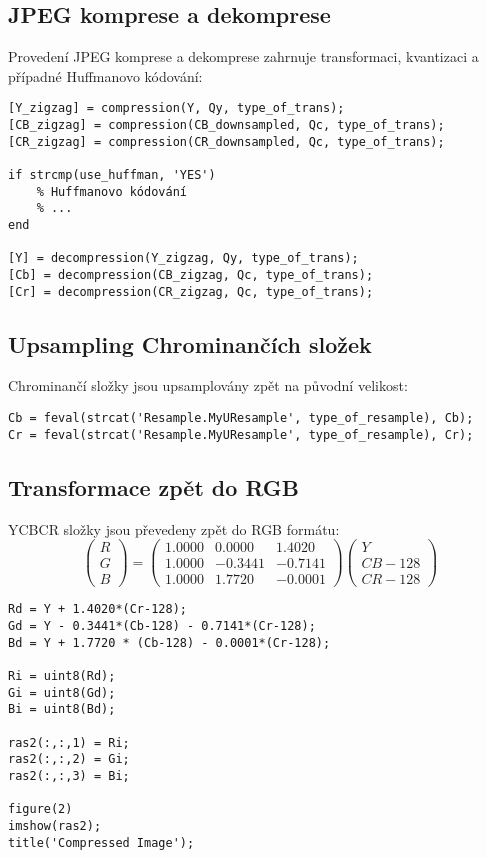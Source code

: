 \subsection*{JPEG komprese a dekomprese}
Provedení JPEG komprese a dekomprese zahrnuje transformaci, kvantizaci a případné Huffmanovo kódování:
\begin{verbatim}
[Y_zigzag] = compression(Y, Qy, type_of_trans);
[CB_zigzag] = compression(CB_downsampled, Qc, type_of_trans);
[CR_zigzag] = compression(CR_downsampled, Qc, type_of_trans);

if strcmp(use_huffman, 'YES')
    % Huffmanovo kódování
    % ...
end

[Y] = decompression(Y_zigzag, Qy, type_of_trans);
[Cb] = decompression(CB_zigzag, Qc, type_of_trans);
[Cr] = decompression(CR_zigzag, Qc, type_of_trans);
\end{verbatim}

\subsection*{Upsampling Chrominančích složek}
Chrominančí složky jsou upsamplovány zpět na původní velikost:
\begin{verbatim}
Cb = feval(strcat('Resample.MyUResample', type_of_resample), Cb);
Cr = feval(strcat('Resample.MyUResample', type_of_resample), Cr);
\end{verbatim}

\subsection*{Transformace zpět do RGB}
YCBCR složky jsou převedeny zpět do RGB formátu\cite{pIDhmNtdwMgbcGoe}\cite{ygeiGeoinf2}:
\[
\begin{pmatrix}
R \\
G \\
B
\end{pmatrix}
=
\begin{pmatrix}
1.0000 & 0.0000 & 1.4020 \\
1.0000 & -0.3441 & -0.7141 \\
1.0000 & 1.7720 & -0.0001
\end{pmatrix}
\begin{pmatrix}
Y \\
CB - 128 \\
CR - 128
\end{pmatrix}
\]

\begin{verbatim}
Rd = Y + 1.4020*(Cr-128);
Gd = Y - 0.3441*(Cb-128) - 0.7141*(Cr-128);
Bd = Y + 1.7720 * (Cb-128) - 0.0001*(Cr-128);

Ri = uint8(Rd);
Gi = uint8(Gd);
Bi = uint8(Bd);

ras2(:,:,1) = Ri;
ras2(:,:,2) = Gi;
ras2(:,:,3) = Bi;

figure(2)
imshow(ras2);
title('Compressed Image');
\end{verbatim}

